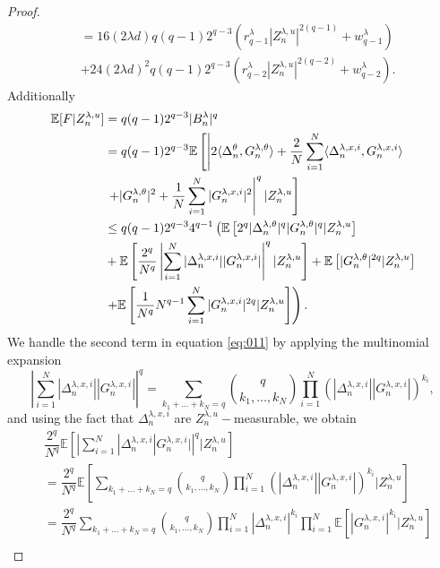 \documentclass[10pt,a4paper]{amsart}
\begin{document}
\begin{proof}
\begin{align}
&=16(2\lambda d)q(q-1)2^{q-3} \left(r_{q-1}^{\lambda}|Z_n^{\lambda,u}|^{2(q-1)}+w_{q-1}^{\lambda}\right)\nonumber\\&+24(2\lambda d)^2q(q-1)2^{q-3} \left(r_{q-2}^{\lambda}|Z_n^{\lambda,u}|^{2(q-2)}+w_{q-2}^{\lambda}\right).\label{eq:A4}
\end{align}
Additionally
\begin{align}
\mathbb{E}[F|Z_n^{\lambda,u}]&=q(q-1)2^{q-3}|B_n^{\lambda}|^q\notag\\
&=q(q-1)2^{q-3}\mathbb{E}\left[\left|2\langle \Delta_n^{\theta},G_n^{\lambda,\theta}\rangle+\dfrac{2}{N}\sum_{i=1}^N\langle \Delta_n^{\lambda,x,i},G_n^{\lambda,x,i}\rangle\right.\right.\notag\\
&\left.\left.+|G_n^{\lambda,\theta}|^2+\dfrac{1}{N}\sum_{i=1}^N|G_n^{\lambda,x,i}|^2\right|^q|Z_n^{\lambda,u} \right]\notag\\
&\leq q(q-1)2^{q-3}4^{q-1}\left(\mathbb{E}\left[2^q|\Delta_n^{\lambda,\theta}|^q|G_n^{\lambda,\theta}|^q|Z_n^{\lambda,u}\right]\right.\notag\\
&+\mathbb{E}\left[\dfrac{2^q}{N^q} \left|\sum_{i=1}^N |\Delta_n^{\lambda,x,i}||G_n^{\lambda,x,i}|\right|^q|Z_n^{\lambda,u}\right]+\mathbb{E}\left[|G_n^{\lambda,\theta}|^{2q}|Z_n^{\lambda,u}\right]\notag\\
&\left.+\mathbb{E}\left[\dfrac{1}{N^q}N^{q-1}\sum_{i=1}^N|G_n^{\lambda,x,i}|^{2q}|Z_n^{\lambda,u}\right]\right).\label{eq:011}
\end{align}
We handle the second term in equation \eqref{eq:011} by applying the multinomial expansion
$$\left|\sum_{i=1}^N |\Delta_n^{\lambda,x,i}||G_n^{\lambda,x,i}|\right|^q=\sum_{k_1+\ldots+k_N=q}\binom{q}{k_1,\ldots,k_N}\prod_{i=1}^N\left(|\Delta_n^{\lambda,x,i}||G_n^{\lambda,x,i}|\right)^{k_i},$$
and using the fact that $\Delta_n^{\lambda,x,i}$ are $Z_n^{\lambda,u}-$measurable, we obtain
\begin{align*}
&\dfrac{2^q}{N^q}\mathbb{E}\left[\left|\sum_{i=1}^N |\Delta_n^{\lambda,x,i}|G_n^{\lambda,x,i}|\right|^q|Z_n^{\lambda,u}\right]\\
&= \dfrac{2^q}{N^q}\mathbb{E}\left[\sum_{k_1+\ldots+k_N=q}\binom{q}{k_1,\ldots,k_N}\prod_{i=1}^N\left(|\Delta_n^{\lambda,x,i}||G_n^{\lambda,x,i}|\right)^{k_i}|Z_n^{\lambda,u}\right]\\
&=\dfrac{2^q}{N^q}\sum_{k_1+\ldots+k_N=q}\binom{q}{k_1,\ldots,k_N}\prod_{i=1}^N |\Delta_n^{\lambda,x,i}|^{k_i}\prod_{i=1}^N\mathbb{E}\left[|G_n^{\lambda,x,i}|^{k_i}|Z_n^{\lambda,u}\right]\\

\end{align*}
\end{proof}
\end{document}
